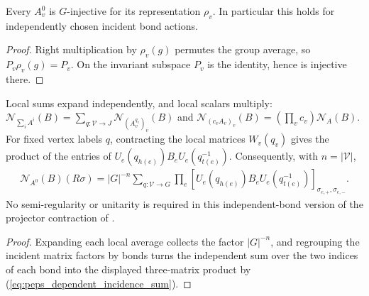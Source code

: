 \begin{lemma}%
    \label{thm:peps_dependent_averaging_injective}
    \leanok
    Every $A_v^0$ is $G$-injective for its representation $\rho_v$.
    In particular this holds for independently chosen incident bond actions.
\end{lemma}
\begin{proof}\leanok
    Right multiplication by $\rho_v(g)$ permutes the group average, so
    $P_v\rho_v(g)=P_v$. On the invariant subspace $P_v$ is the identity,
    hence is injective there.
\end{proof}

\begin{lemma}%
    \label{thm:peps_dependent_projector_expansion}
    \leanok
    Local sums expand independently, and local scalars multiply:
    $\mathcal N_{\sum_i A^i}(B)=\sum_{q:\mathcal V\to J}
        \mathcal N_{(A^{q_v}_v)_v}(B)$ and
    $\mathcal N_{(c_vA_v)_v}(B)=(\prod_vc_v)\mathcal N_A(B)$.
    For fixed vertex labels $q$, contracting the local matrices $W_v(q_v)$
    gives the product of the entries of
    $U_e(q_{h(e)})B_eU_e(q_{t(e)}^{-1})$. Consequently, with $n=|\mathcal V|$,
    \begin{align}
        \mathcal N_{A^0}(B)(R\sigma)
        =|G|^{-n}\sum_{q:\mathcal V\to G}\prod_e
        [U_e(q_{h(e)})B_eU_e(q_{t(e)}^{-1})]_{
            \sigma_{e,+},\sigma_{e,-}}.
        \label{eq:peps_dependent_projector_expansion}
    \end{align}
    No semi-regularity or unitarity is required in this independent-bond
    version of the projector contraction of \cite[Theorem~5.9]{Schuch2010PEPS}.
\end{lemma}
\begin{proof}\leanok
    Expanding each local average collects the factor $|G|^{-n}$, and regrouping
    the incident matrix factors by bonds turns the independent sum over the two
    indices of each bond into the displayed three-matrix product by
    (\ref{eq:peps_dependent_incidence_sum}).
\end{proof}

